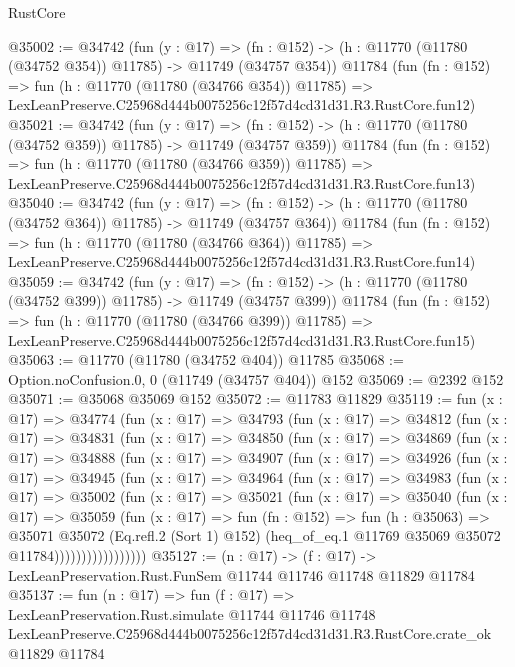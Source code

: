 \begin{lexlean}{RustCore}
\begin{coremodule}
@35002 := @34742
    (fun (y : @17) =>
    (fn : @152) -> (h : @11770 (@11780 (@34752 @354)) @11785) -> @11749 (@34757 @354))
    @11784
    (fun (fn : @152) =>
    fun (h : @11770 (@11780 (@34766 @354)) @11785) =>
    LexLeanPreserve.C25968d444b0075256c12f57d4cd31d31.R3.RustCore.fun12)
@35021 := @34742
    (fun (y : @17) =>
    (fn : @152) -> (h : @11770 (@11780 (@34752 @359)) @11785) -> @11749 (@34757 @359))
    @11784
    (fun (fn : @152) =>
    fun (h : @11770 (@11780 (@34766 @359)) @11785) =>
    LexLeanPreserve.C25968d444b0075256c12f57d4cd31d31.R3.RustCore.fun13)
@35040 := @34742
    (fun (y : @17) =>
    (fn : @152) -> (h : @11770 (@11780 (@34752 @364)) @11785) -> @11749 (@34757 @364))
    @11784
    (fun (fn : @152) =>
    fun (h : @11770 (@11780 (@34766 @364)) @11785) =>
    LexLeanPreserve.C25968d444b0075256c12f57d4cd31d31.R3.RustCore.fun14)
@35059 := @34742
    (fun (y : @17) =>
    (fn : @152) -> (h : @11770 (@11780 (@34752 @399)) @11785) -> @11749 (@34757 @399))
    @11784
    (fun (fn : @152) =>
    fun (h : @11770 (@11780 (@34766 @399)) @11785) =>
    LexLeanPreserve.C25968d444b0075256c12f57d4cd31d31.R3.RustCore.fun15)
@35063 := @11770 (@11780 (@34752 @404)) @11785
@35068 := Option.noConfusion.{0, 0} (@11749 (@34757 @404)) @152
@35069 := @2392 @152
@35071 := @35068 @35069 @152
@35072 := @11783 @11829
@35119 := fun (x : @17) =>
  @34774
    (fun (x : @17) =>
    @34793
      (fun (x : @17) =>
      @34812
        (fun (x : @17) =>
        @34831
          (fun (x : @17) =>
          @34850
            (fun (x : @17) =>
            @34869
              (fun (x : @17) =>
              @34888
                (fun (x : @17) =>
                @34907
                  (fun (x : @17) =>
                  @34926
                    (fun (x : @17) =>
                    @34945
                      (fun (x : @17) =>
                      @34964
                        (fun (x : @17) =>
                        @34983
                          (fun (x : @17) =>
                          @35002
                            (fun (x : @17) =>
                            @35021
                              (fun (x : @17) =>
                              @35040
                                (fun (x : @17) =>
                                @35059
                                  (fun (x : @17) =>
                                  fun (fn : @152) =>
                                  fun (h : @35063) =>
                                  @35071
                                    @35072
                                    (Eq.refl.{2} (Sort 1) @152)
                                    (heq_of_eq.{1} @11769 @35069 @35072 @11784)))))))))))))))))
@35127 := (n : @17) ->
  (f : @17) -> LexLeanPreservation.Rust.FunSem @11744 @11746 @11748 @11829 @11784
@35137 := fun (n : @17) =>
  fun (f : @17) =>
  LexLeanPreservation.Rust.simulate
    @11744
    @11746
    @11748
    LexLeanPreserve.C25968d444b0075256c12f57d4cd31d31.R3.RustCore.crate_ok
    @11829
    @11784
\end{coremodule}
\end{lexlean}
